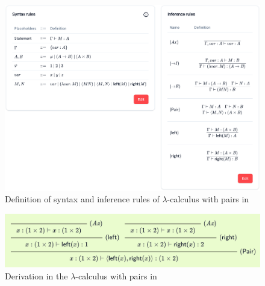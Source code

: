 \begin{figure}[!htbp]
    \centering
    \includegraphics[width=\textwidth]{evaluation/lambda-with-pairs-definition.png}
    \caption{Definition of syntax and inference rules of $\lambda$-calculus with pairs in \projectname{}}
    \label{fig:evaluation:lambda-with-pairs-definition}
\end{figure}
\begin{figure}[!htbp]
    \centering
    \includegraphics[width=\textwidth]{evaluation/lambda-with-pairs-derivation.png}
    \caption{Derivation in the $\lambda$-calculus with pairs in \projectname{}}
    \label{fig:evaluation:lambda-with-pairs-derivation}
\end{figure}

